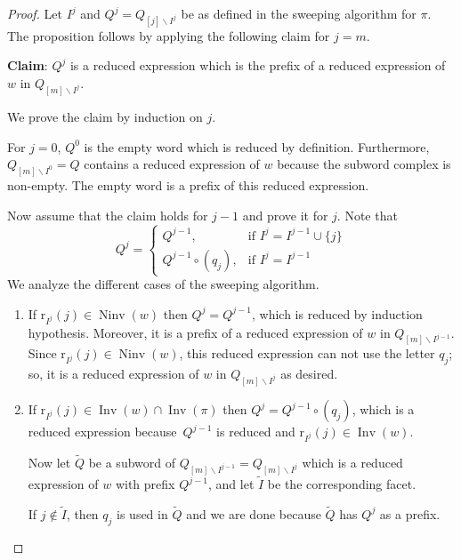 \documentclass{amsart}
\theoremstyle{definition}
\DeclareMathOperator{\Inv}{Inv} %
\DeclareMathOperator{\Ninv}{Ninv} %
\newcommand{\rootFunction}[2]{\mathrm{r}_{#1}(#2)} %
\begin{document}
\begin{proof}
    Let $I^j$ and $Q^j=Q_{[j]\smallsetminus I^j}$ be as defined in the sweeping algorithm for $\pi$.  
    The proposition follows by applying the following claim for $j=m$. 
    \smallskip
    
    {\bf Claim}: $Q^j$ is a reduced expression which is the prefix of a reduced expression of $w$ in $Q_{[m]\smallsetminus I^j}$.

    \smallskip
    We prove the claim by induction on $j$.

    For $j=0$, $Q^0$ is the empty word which is reduced by definition. 
    Furthermore, $Q_{[m]\smallsetminus I^0 }=Q$ contains a reduced expression of $w$ because the subword complex is non-empty. The empty word is a prefix of this reduced expression.  

    Now assume that the claim holds for $j-1$ and prove it for $j$. 
    Note that 
    \begin{equation}
         Q^j = 
  \begin{cases}
    Q^{j-1}, & \text{if } I^j=I^{j-1}\cup \{j\} \\
    Q^{j-1}\circ (q_j), & \text{if } I^j=I^{j-1}
  \end{cases}
    \end{equation}    
    We analyze the different cases of the sweeping algorithm.
    \begin{enumerate}
    \item If $\rootFunction{I^j}{j}\in \Ninv(w)$ then 
    $Q^j=Q^{j-1}$, which is reduced by induction hypothesis. 
    Moreover, it is a prefix of a reduced expression of $w$ in $Q_{[m]\smallsetminus I^{j-1}}$.
    Since $\rootFunction{I^j}{j}\in \Ninv(w)$, this reduced expression can not use the letter $q_j$; so, it is a reduced expression of $w$ in $Q_{[m]\smallsetminus I^{j}}$ as desired.
    \item If $\rootFunction{I^j}{j}\in \Inv(w) \cap \Inv (\pi)$ then $Q^j= Q^{j-1}\circ (q_j)$, which is a reduced expression because~$Q^{j-1}$ is reduced and $\rootFunction{I^j}{j}\in \Inv(w)$. 
    
    Now let $\widetilde Q$ be a subword of $Q_{[m]\smallsetminus I^{j-1}}=Q_{[m]\smallsetminus I^{j}}$ which is a reduced expression of $w$ with prefix $Q^{j-1}$, and let $\widetilde I$ be the corresponding facet.
    
    If $j\notin \widetilde I$, then $q_j$ is used in $\widetilde Q$ and we are done because $\widetilde Q$ has $Q^j$ as a prefix. 


\end{enumerate}
\end{proof}
\end{document}
